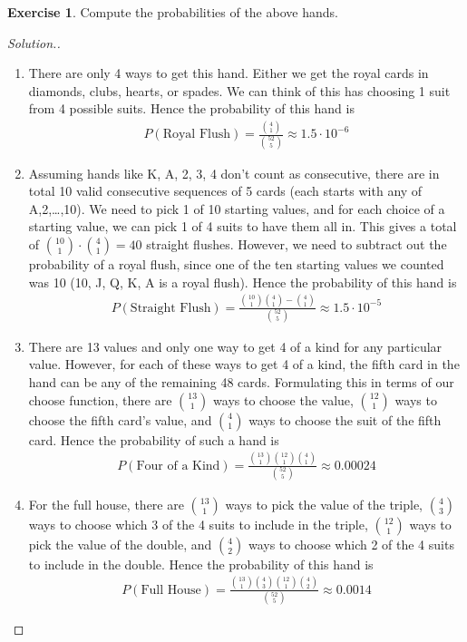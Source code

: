 \documentclass[11pt,letterpaper]{article}
\numberwithin{theorem}{section}
\numberwithin{definition}{section}
\numberwithin{lemma}{section}
\numberwithin{corollary}{section}
\numberwithin{proposition}{section}
\theoremstyle{definition}
\numberwithin{remark}{section}
\numberwithin{claim}{section}
\numberwithin{observation}{section}
\numberwithin{fact}{section}
\numberwithin{assumption}{section}
\numberwithin{example}{section}
\newtheorem{exercise}[theorem]{Exercise}
\numberwithin{exercise}{section}
\begin{document}
\begin{exercise}
Compute the probabilities of the above hands.
\end{exercise}
\begin{proof}[Solution.]
$ $
\begin{enumerate}
\item There are only 4 ways to get this hand. Either we get the royal cards in diamonds, clubs, hearts, or spades. We can think of this has choosing 1 suit from 4 possible suits. Hence the probability of this hand is
\begin{align*}
P(\text{Royal Flush}) = \frac{\binom{4}{1}}{\binom{52}{5}} \approx 1.5 \cdot 10^{-6}
\end{align*}

\item Assuming hands like K, A, 2, 3, 4 don't count as consecutive, there are in total 10 valid consecutive sequences of 5 cards (each starts with any of A,2,\dots,10). We need to pick 1 of 10 starting values, and for each choice of a starting value, we can pick 1 of 4 suits to have them all in. This gives a total of $\binom{10}{1} \cdot \binom{4}{1} = 40$ straight flushes. However, we need to subtract out the probability of a royal flush, since one of the ten starting values we counted was 10 (10, J, Q, K, A is a royal flush). Hence the probability of this hand is
\begin{align*}
P(\text{Straight Flush}) = \frac{\binom{10}{1}  \binom{4}{1}-\binom{4}{1}}{\binom{52}{5}} \approx 1.5 \cdot 10^{-5}
\end{align*}

\item There are 13 values and only one way to get 4 of a kind for any particular value. However, for each of these ways to get 4 of a kind, the fifth card in the hand can be any of the remaining 48 cards. Formulating this in terms of our choose function, there are $\binom{13}{1}$ ways to choose the value, $\binom{12}{1}$ ways to choose the fifth card's value, and $\binom{4}{1}$ ways to choose the suit of the fifth card. Hence the probability of such a hand is
\begin{align*}
P(\text{Four of a Kind}) = \frac{\binom{13}{1}\binom{12}{1}\binom{4}{1}}{\binom{52}{5}} \approx 0.00024
\end{align*}

\item For the full house, there are $\binom{13}{1}$ ways to pick the value of the triple, $\binom{4}{3}$ ways to choose which 3 of the 4 suits to include in the triple, $\binom{12}{1}$ ways to pick the value of the double, and $\binom{4}{2}$ ways to choose which 2 of the 4 suits to include in the double. Hence the probability of this hand is
\begin{align*}
P(\text{Full House}) = \frac{\binom{13}{1} \binom{4}{3} \binom{12}{1}\binom{4}{2}}{\binom{52}{5}} \approx 0.0014
\end{align*}


\end{enumerate}
\end{proof}
\end{document}
